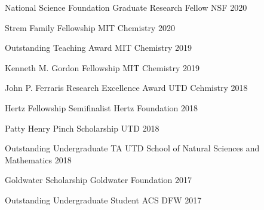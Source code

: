 
\begin{cvhonors}

  \cvhonor
    {National Science Foundation Graduate Research Fellow} %
    {NSF} %
    {} %
    {2020} %
    
    
  \cvhonor
    {Strem Family Fellowship} %
    {MIT Chemistry} %
    {} %
    {2020} %

  \cvhonor
    {Outstanding Teaching Award} %
    {MIT Chemistry} %
    {} %
    {2019} %

  \cvhonor
    {Kenneth M. Gordon Fellowship} %
    {MIT Chemistry} %
    {} %
    {2019} %

  \cvhonor
    {John P. Ferraris Research Excellence Award} %
    {UTD Cehmistry} %
    {} %
    {2018} %


\cvhonor
{Hertz Fellowship Semifinalist} %
{Hertz Foundation} %
{} %
{2018} %


\cvhonor
{Patty Henry Pinch Scholarship} %
{UTD} %
{} %
{2018} %


\cvhonor
{Outstanding Undergraduate TA} %
{UTD School of Natural Sciences and Mathematics} %
{} %
{2018} %

\cvhonor
{Goldwater Scholarship} %
{Goldwater Foundation} %
{} %
{2017} %


\cvhonor
{Outstanding Undergraduate Student} %
{ACS DFW} %
{} %
{2017} %


\end{cvhonors}
